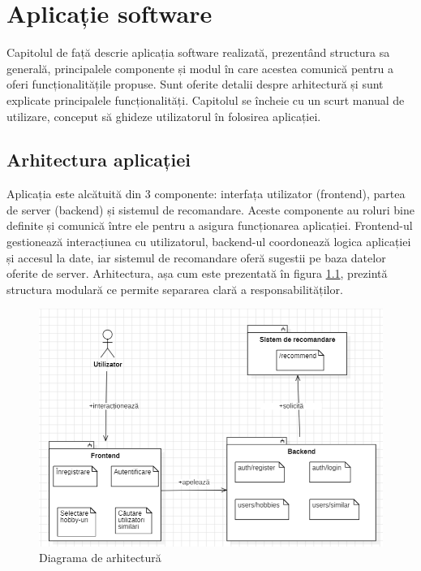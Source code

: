 \sloppy
\chapter{Aplicație software}
\label{chap:ch4}

\par
Capitolul de față descrie aplicația software realizată, prezentând structura sa generală, principalele componente și modul în care acestea comunică pentru a oferi funcționalitățile propuse.
Sunt oferite detalii despre arhitectură și sunt explicate principalele funcționalități. 
Capitolul se încheie cu un scurt manual de utilizare, conceput să ghideze utilizatorul în folosirea aplicației. 

\section{Arhitectura aplicației}
\label{sec:ch4sec1}

Aplicația este alcătuită din 3 componente: interfața utilizator (frontend), partea de server (backend) și sistemul de recomandare. 
Aceste componente au roluri bine definite și comunică între ele pentru a asigura funcționarea aplicației.
Frontend-ul gestionează interacțiunea cu utilizatorul, backend-ul coordonează logica aplicației și accesul la date, iar sistemul de recomandare oferă sugestii pe baza datelor oferite de server.
Arhitectura, așa cum este prezentată în figura \ref{FigArchitectureDiagram}, prezintă structura modulară ce permite separarea clară a responsabilităților.

\begin{figure}[htbp]
	\centering
    \includegraphics[scale=0.6]{./figures/architecture-diagram.png}
	\caption{Diagrama de arhitectură}
	\label{FigArchitectureDiagram}
\end{figure}

